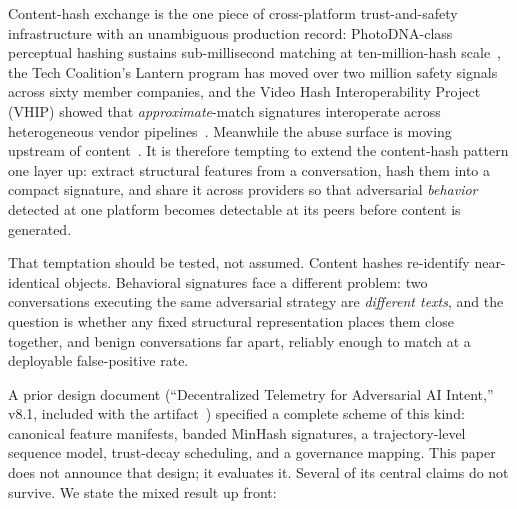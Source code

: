 \documentclass[letterpaper,twocolumn,10pt]{article}
\begin{document}
Content-hash exchange is the one piece of cross-platform trust-and-safety
infrastructure with an unambiguous production record: PhotoDNA-class
perceptual hashing sustains sub-millisecond matching at
ten-million-hash scale~\cite{photodna2023}, the Tech Coalition's Lantern
program has moved over two million safety signals across sixty member
companies, and the Video Hash Interoperability Project (VHIP) showed that
\emph{approximate}-match signatures interoperate across heterogeneous vendor
pipelines~\cite{lantern2026}. Meanwhile the abuse surface is moving upstream
of content~\cite{lantern2026,sok2026promptinjection,greshake2023}. It is
therefore tempting to extend the content-hash pattern one layer up: extract
structural features from a conversation, hash them into a compact signature,
and share it across providers so that adversarial \emph{behavior} detected
at one platform becomes detectable at its peers before content is generated.

That temptation should be tested, not assumed. Content hashes re-identify
near-identical objects. Behavioral signatures face a different problem: two
conversations executing the same adversarial strategy are \emph{different
texts}, and the question is whether any fixed structural representation
places them close together, and benign conversations far apart,
reliably enough to match at a deployable false-positive rate.

A prior design document (``Decentralized Telemetry for Adversarial AI
Intent,'' v8.1, included with the artifact~\cite{artifact2026}) specified a
complete scheme of this kind: canonical feature manifests, banded MinHash
signatures, a trajectory-level sequence model, trust-decay scheduling, and a
governance mapping. This paper does not announce that design; it evaluates
it. Several of its central claims do not survive. We state the mixed
result up front:
\end{document}
